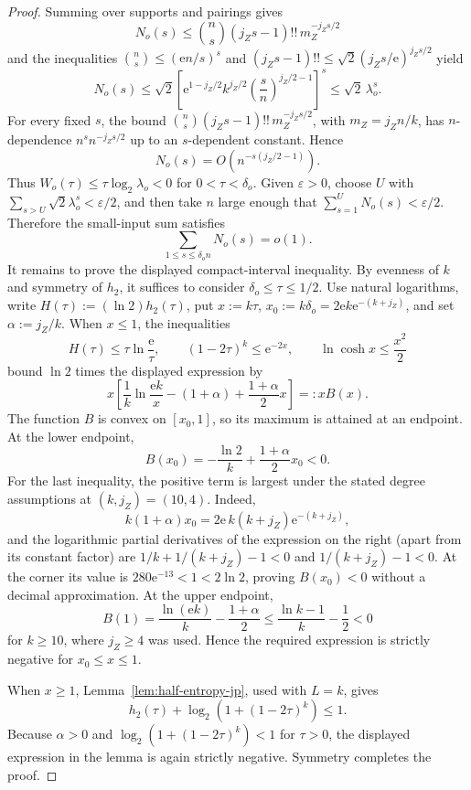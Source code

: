 \documentclass[11pt]{article}
\theoremstyle{definition}
\newcommand{\h}{h_2}
\begin{document}
\begin{proof}
Summing over supports and pairings gives
\[
N_o(s)\le \binom ns (j_Zs-1)!!\,m_Z^{-j_Zs/2}
\]
and the inequalities \(\binom ns\le(\mathrm{e}n/s)^s\) and
\((j_Zs-1)!!\le\sqrt2(j_Zs/\mathrm{e})^{j_Zs/2}\) yield
\[
N_o(s)\le
\sqrt2\left[
\mathrm{e}^{1-j_Z/2}k^{j_Z/2}\left(\frac{s}{n}\right)^{j_Z/2-1}
\right]^s
\le \sqrt2\,\lambda_o^s.
\]
For every fixed \(s\), the bound
\(\binom ns (j_Zs-1)!!\,m_Z^{-j_Zs/2}\), with \(m_Z=j_Zn/k\), has \(n\)-dependence
\(n^s n^{-j_Zs/2}\) up to an \(s\)-dependent constant. Hence
\[
N_o(s)=O\!\left(n^{-s(j_Z/2-1)}\right).
\]
Thus \(W_o(\tau)\le \tau\log_2\lambda_o<0\) for \(0<\tau<\delta_o\). Given \(\varepsilon>0\), choose \(U\) with \(\sum_{s>U}\sqrt2\lambda_o^s<\varepsilon/2\), and then take \(n\) large enough that \(\sum_{s=1}^{U}N_o(s)<\varepsilon/2\). Therefore the small-input sum satisfies
\[
\sum_{1\le s\le\delta_o n}N_o(s)=o(1).
\]
It remains to prove the displayed compact-interval inequality. By evenness
of \(k\) and symmetry of \(\h\), it suffices to consider
\(\delta_o\le\tau\le1/2\). Use natural logarithms, write
\(H(\tau):=(\ln2)\h(\tau)\), put \(x:=k\tau\),
\(x_0:=k\delta_o=2\mathrm{e}k\mathrm{e}^{-(k+j_Z)}\), and set
\(\alpha:=j_Z/k\). When \(x\le1\), the inequalities
\[
H(\tau)\le\tau\ln\frac{\mathrm{e}}{\tau},
\qquad
(1-2\tau)^k\le\mathrm{e}^{-2x},
\qquad
\ln\cosh x\le\frac{x^2}{2}
\]
bound \(\ln2\) times the displayed expression by
\[
x\left[
\frac1k\ln\frac{\mathrm{e}k}{x}
-(1+\alpha)+\frac{1+\alpha}{2}x
\right]
=:xB(x).
\]
The function \(B\) is convex on \([x_0,1]\), so its maximum is attained
at an endpoint. At the lower endpoint,
\[
B(x_0)=-\frac{\ln2}{k}+\frac{1+\alpha}{2}x_0<0.
\]
For the last inequality, the positive term is largest under the stated
degree assumptions at \((k,j_Z)=(10,4)\).  Indeed,
\[
k(1+\alpha)x_0=2\mathrm e\,k(k+j_Z)\mathrm e^{-(k+j_Z)},
\]
and the logarithmic partial derivatives of the expression on the right
(apart from its constant factor) are
\(1/k+1/(k+j_Z)-1<0\) and \(1/(k+j_Z)-1<0\).
At the corner its value is \(280\mathrm e^{-13}<1<2\ln2\), proving
\(B(x_0)<0\) without a decimal approximation. At the upper endpoint,
\[
B(1)
=\frac{\ln(\mathrm{e}k)}{k}-\frac{1+\alpha}{2}
\le \frac{\ln k-1}{k}-\frac12<0
\]
for \(k\ge10\), where \(j_Z\ge4\) was used. Hence the required
expression is strictly negative for \(x_0\le x\le1\).

When \(x\ge1\), Lemma~\ref{lem:half-entropy-jp}, used with \(L=k\), gives
\[
\h(\tau)+\log_2\!\left(1+(1-2\tau)^k\right)\le1.
\]
Because \(\alpha>0\) and
\(\log_2(1+(1-2\tau)^k)<1\) for \(\tau>0\), the displayed expression in
the lemma is again strictly negative. Symmetry completes the proof.
\end{proof}
\end{document}
